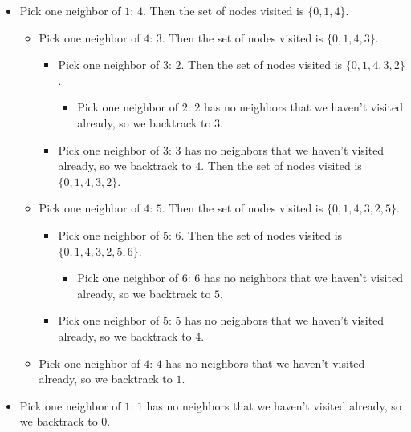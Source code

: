 \documentclass[
  10pt,
  english,
  letterpaper,
,tablecaptionabove
]{scrartcl}
\providecommand{\tightlist}{%
  \setlength{\itemsep}{0pt}\setlength{\parskip}{0pt}}
\begin{document}
\begin{itemize}
\tightlist
\item
  Pick one neighbor of \(1\): \(4\). Then the set of nodes visited is
  \(\{0, 1, 4\}\).

  \begin{itemize}
  \tightlist
  \item
    Pick one neighbor of \(4\): \(3\). Then the set of nodes visited is
    \(\{0, 1, 4, 3\}\).

    \begin{itemize}
    \tightlist
    \item
      Pick one neighbor of \(3\): \(2\). Then the set of nodes visited
      is \(\{0, 1, 4, 3, 2\}\).

      \begin{itemize}
      \tightlist
      \item
        Pick one neighbor of \(2\): \(2\) has no neighbors that we
        haven't visited already, so we backtrack to \(3\).
      \end{itemize}
    \item
      Pick one neighbor of \(3\): \(3\) has no neighbors that we haven't
      visited already, so we backtrack to \(4\). Then the set of nodes
      visited is \(\{0, 1, 4, 3, 2\}\).
    \end{itemize}
  \item
    Pick one neighbor of \(4\): \(5\). Then the set of nodes visited is
    \(\{0, 1, 4, 3, 2, 5\}\).

    \begin{itemize}
    \tightlist
    \item
      Pick one neighbor of \(5\): \(6\). Then the set of nodes visited
      is \(\{0, 1, 4, 3, 2, 5, 6\}\).

      \begin{itemize}
      \tightlist
      \item
        Pick one neighbor of \(6\): \(6\) has no neighbors that we
        haven't visited already, so we backtrack to \(5\).
      \end{itemize}
    \item
      Pick one neighbor of \(5\): \(5\) has no neighbors that we haven't
      visited already, so we backtrack to \(4\).
    \end{itemize}
  \item
    Pick one neighbor of \(4\): \(4\) has no neighbors that we haven't
    visited already, so we backtrack to \(1\).
  \end{itemize}
\item
  Pick one neighbor of \(1\): \(1\) has no neighbors that we haven't
  visited already, so we backtrack to \(0\).
\end{itemize}
\end{document}
